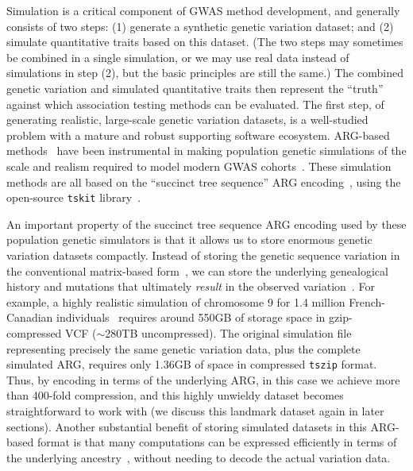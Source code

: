 \documentclass[unnumsec,webpdf,modern,large,namedate]{oup-authoring-template}%
\begin{document}
Simulation is a critical component of GWAS method development, and
generally consists of two steps: (1) generate a synthetic genetic
variation dataset; and (2) simulate quantitative traits
based on this dataset.
(The two steps may sometimes be combined
in a single simulation, or we may use real data instead of simulations in
step (2), but the basic principles are still the same.)
The combined genetic variation and
simulated quantitative traits then represent the ``truth'' against
which association testing methods can be evaluated.
The first step, of generating realistic, large-scale genetic variation
datasets, is a well-studied problem with a mature and robust supporting
software ecosystem. ARG-based methods~\citep{kelleher2016efficient,
kelleher2018efficient,haller2018tree,adrion2020,baumdicker2022efficient,anderson2023}
have been instrumental in making population genetic simulations
of the scale and realism
required to model modern GWAS cohorts~\cite[e.g.][]{martin2017,zaidi2020}.
These simulation methods are all based on the ``succinct tree
sequence'' ARG encoding~\citep{wong2023general},
using the open-source \texttt{tskit} library~\citep{ralph2020}.

An important property of the succinct tree sequence ARG encoding
used by these population genetic simulators is that it allows us to
store enormous genetic variation datasets compactly. Instead of
storing the genetic sequence variation in the conventional
matrix-based form~\citep[e.g.\ VCF,][]{danecek2011},
we can store the underlying genealogical history
and mutations that ultimately \emph{result} in the observed
variation~\citep{kelleher2019}.
For example, a highly realistic simulation
of chromosome 9 for 1.4 million
French-Canadian individuals~\citep{anderson2023}
requires around 550GB of storage space in
gzip-compressed VCF ($\sim$280TB uncompressed).
The original simulation file representing
precisely the same genetic variation data, plus the
complete simulated ARG, requires only 1.36GB of space
in compressed \texttt{tszip} format. Thus,
by encoding in terms of the underlying ARG,
in this case we achieve more than 400-fold compression,
and this highly unwieldy dataset
becomes straightforward to work with (we discuss this
landmark dataset again in later sections).
Another substantial benefit of storing simulated datasets
in this ARG-based format is that many computations can
be expressed efficiently in terms of the underlying
ancestry~\citep{kelleher2016efficient,ralph2020}, without
needing to decode the actual variation data.
\end{document}

